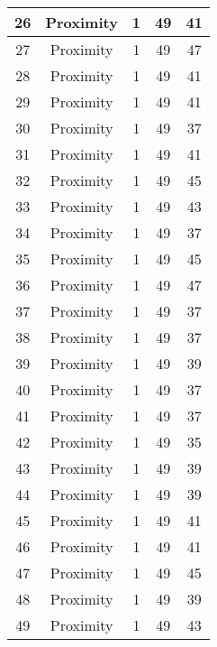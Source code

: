 \documentclass[results.tex]{subfiles}
\begin{document}
\begin{center}
\begin{tabular}{| c || c | c | c | c |}
    \hline
    26 & Proximity & 1 & 49 & 41 \\ 
    \hline
    27 & Proximity & 1 & 49 & 47 \\ 
    \hline
    28 & Proximity & 1 & 49 & 41 \\ 
    \hline
    29 & Proximity & 1 & 49 & 41 \\ 
    \hline
    30 & Proximity & 1 & 49 & 37 \\ 
    \hline
    31 & Proximity & 1 & 49 & 41 \\ 
    \hline
    32 & Proximity & 1 & 49 & 45 \\ 
    \hline
    33 & Proximity & 1 & 49 & 43 \\ 
    \hline
    34 & Proximity & 1 & 49 & 37 \\ 
    \hline
    35 & Proximity & 1 & 49 & 45 \\ 
    \hline
    36 & Proximity & 1 & 49 & 47 \\ 
    \hline
    37 & Proximity & 1 & 49 & 37 \\ 
    \hline
    38 & Proximity & 1 & 49 & 37 \\ 
    \hline
    39 & Proximity & 1 & 49 & 39 \\ 
    \hline
    40 & Proximity & 1 & 49 & 37 \\ 
    \hline
    41 & Proximity & 1 & 49 & 37 \\ 
    \hline
    42 & Proximity & 1 & 49 & 35 \\ 
    \hline
    43 & Proximity & 1 & 49 & 39 \\ 
    \hline
    44 & Proximity & 1 & 49 & 39 \\ 
    \hline
    45 & Proximity & 1 & 49 & 41 \\ 
    \hline
    46 & Proximity & 1 & 49 & 41 \\ 
    \hline
    47 & Proximity & 1 & 49 & 45 \\ 
    \hline
    48 & Proximity & 1 & 49 & 39 \\ 
    \hline
    49 & Proximity & 1 & 49 & 43 \\ 
    \hline   \end{tabular}
\end{center}
\end{document}
